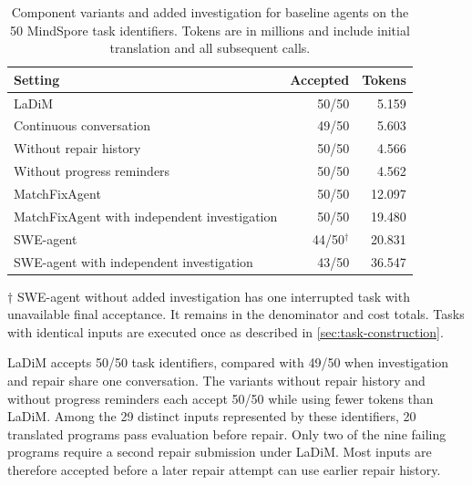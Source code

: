 \documentclass{article}
\begin{document}
\begin{table}[!htb]
\caption{Component variants and added investigation for baseline agents on the 50 MindSpore task identifiers. Tokens are in millions and include initial translation and all subsequent calls.}
\label{tab:components}
\centering
\small
\setlength{\tabcolsep}{4pt}

\begin{tabular*}{\linewidth}{@{\extracolsep{\fill}}lrr@{}}
\toprule
\textbf{Setting} & \textbf{Accepted} & \textbf{Tokens} \\
\midrule
LaDiM & 50/50 & 5.159 \\
Continuous conversation & 49/50 & 5.603 \\
Without repair history & 50/50 & 4.566 \\
Without progress reminders & 50/50 & 4.562 \\
MatchFixAgent & 50/50 & 12.097 \\
MatchFixAgent with independent investigation & 50/50 & 19.480 \\
SWE-agent & 44/50$^{\dagger}$ & 20.831 \\
SWE-agent with independent investigation & 43/50 & 36.547 \\
\bottomrule
\end{tabular*}


\par\vspace{3pt}
\begin{minipage}{\linewidth}
$\dagger$ SWE-agent without added investigation has one interrupted task with unavailable final acceptance. It remains in the denominator and cost totals. Tasks with identical inputs are executed once as described in \cref{sec:task-construction}.
\end{minipage}
\end{table}
LaDiM accepts 50/50 task identifiers, compared with 49/50 when investigation and repair share one conversation. The variants without repair history and without progress reminders each accept 50/50 while using fewer tokens than LaDiM. Among the 29 distinct inputs represented by these identifiers, 20 translated programs pass evaluation before repair. Only two of the nine failing programs require a second repair submission under LaDiM. Most inputs are therefore accepted before a later repair attempt can use earlier repair history.
\end{document}
